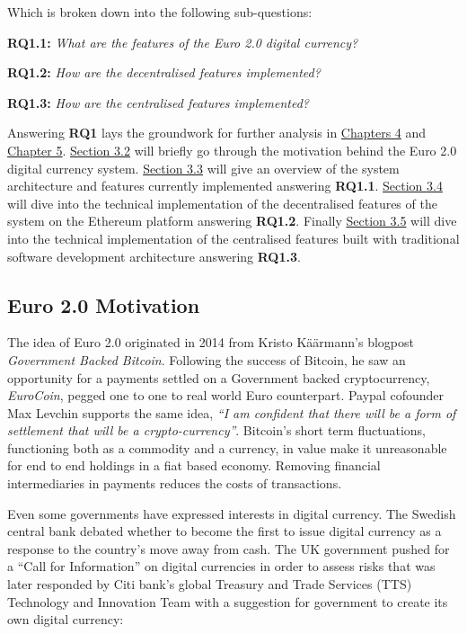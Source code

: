 \documentclass[12pt]{article} %
\begin{document}
Which is broken down into the following sub-questions:
\begin{quoting}
	\textbf{RQ1.1:} \textit{What are the features of the Euro 2.0 digital currency?}
\end{quoting}{
\begin{quoting}
	\textbf{RQ1.2:} \textit{How are the decentralised features implemented?}
\end{quoting}{
\begin{quoting}
	\textbf{RQ1.3:} \textit{How are the centralised features implemented?}
\end{quoting}

Answering \textbf{RQ1} lays the groundwork for further analysis in \hyperref[sec:4]{Chapters 4} and \hyperref[sec:5]{Chapter 5}. \hyperref[ssec:3.2]{Section 3.2} will briefly go through the motivation behind the Euro 2.0 digital currency system. \hyperref[ssec:3.3]{Section 3.3} will give an overview of the system architecture and features currently implemented answering \textbf{RQ1.1}. \hyperref[ssec:3.4]{Section 3.4} will dive into the technical implementation of the decentralised features of the system on the Ethereum platform answering \textbf{RQ1.2}. Finally \hyperref[ssec:3.5]{Section 3.5} will dive into the technical implementation of the centralised features built with traditional software development architecture answering \textbf{RQ1.3}.

\subsection{Euro 2.0 Motivation} \label{ssec:3.2}

The idea of Euro 2.0 originated in 2014 from Kristo Käärmann's blogpost \textit{Government Backed Bitcoin}\cite{kaarmann2014government}. Following the success of Bitcoin, he saw an opportunity for a payments settled on a Government backed cryptocurrency, \textit{EuroCoin}, pegged one to one to real world Euro counterpart. Paypal cofounder Max Levchin supports the same idea, \textit{``I am confident that there will be a form of settlement that will be a crypto-currency''}\cite{pando2014levchin}. Bitcoin's short term fluctuations, functioning both as a commodity and a currency, in value make it unreasonable for end to end holdings in a fiat based economy. Removing financial intermediaries in payments reduces the costs of transactions.

Even some governments have expressed interests in digital currency. The Swedish central bank debated whether to become the first to issue digital currency as a response to the country's move away from cash\cite{milne2016sweden}. The UK government pushed for a ``Call for Information'' on digital currencies in order to assess risks\cite{nermin2014ukcall} that was later responded by Citi bank's global Treasury and Trade Services (TTS) Technology and Innovation Team with a suggestion for government to create its own digital currency\cite{spaven2015ukcurrency}:

}}
\end{document}
